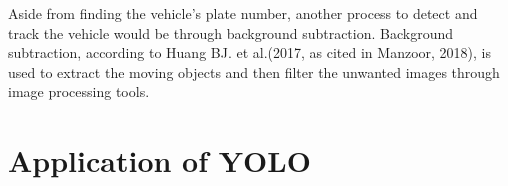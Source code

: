 	Aside from finding the vehicle’s plate number, another process to detect and track the vehicle would be through background subtraction. Background subtraction, according to Huang BJ. et al.(2017, as cited in Manzoor, 2018), is used to extract the moving objects and then filter the unwanted images through image processing tools. 


\section{Application of YOLO}








